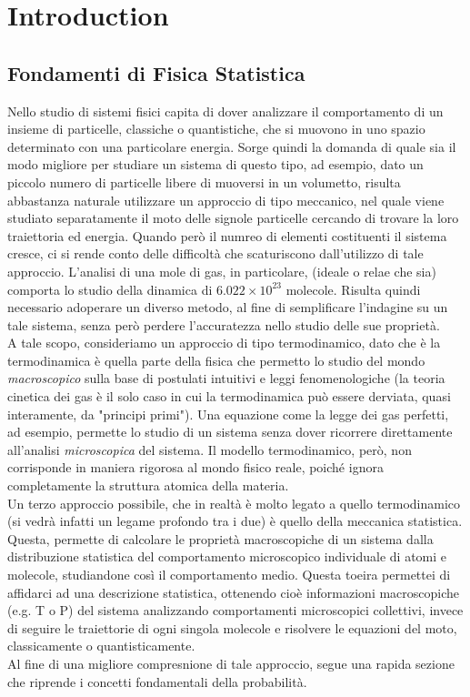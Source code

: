 \chapter*{Introduction}
\label{cha:introduction} %



\section*{Fondamenti di Fisica Statistica}

Nello studio di sistemi fisici capita di dover analizzare il comportamento di un insieme di particelle, classiche o quantistiche, che si muovono in uno spazio determinato con una particolare energia. Sorge quindi la domanda di quale sia il modo migliore per studiare un sistema di questo tipo, ad esempio, dato un piccolo numero di particelle libere di muoversi in un volumetto, risulta abbastanza naturale utilizzare un approccio di tipo meccanico, nel quale viene studiato separatamente il moto delle signole particelle cercando di trovare la loro traiettoria ed energia. Quando però il numreo di elementi costituenti il sistema cresce, ci si rende conto delle difficoltà che scaturiscono dall'utilizzo di tale approccio. L'analisi di una mole di gas, in particolare, (ideale o relae che sia) comporta lo studio della dinamica di $6.022\times 10^{23}$ molecole. Risulta quindi necessario adoperare un diverso metodo, al fine di semplificare l'indagine su un tale sistema, senza però perdere l'accuratezza nello studio delle sue proprietà.
\\
A tale scopo, consideriamo un approccio di tipo termodinamico, dato che è la termodinamica è quella parte della fisica che permetto lo studio del mondo \textit{macroscopico} sulla base di postulati intuitivi e leggi fenomenologiche (la teoria cinetica dei gas è il solo caso in cui la termodinamica può essere derviata, quasi interamente, da "principi primi"). Una equazione come la legge dei gas perfetti, ad esempio, permette lo studio di un sistema senza dover ricorrere direttamente all'analisi \textit{microscopica} del sistema. Il modello termodinamico, però, non corrisponde in maniera rigorosa al mondo fisico reale, poiché ignora completamente la struttura atomica della materia.
\\
Un terzo approccio possibile, che in realtà è molto legato a quello termodinamico (si vedrà infatti un legame profondo tra i due) è quello della meccanica statistica. Questa, permette di calcolare le proprietà macroscopiche di un sistema dalla distribuzione statistica del comportamento microscopico individuale di atomi e molecole, studiandone così il comportamento medio. Questa toeira permettei di affidarci ad una descrizione statistica, ottenendo cioè informazioni macroscopiche (e.g. T o P) del sistema analizzando comportamenti microscopici collettivi, invece di seguire le traiettorie di ogni singola molecole e risolvere le equazioni del moto, classicamente o quantisticamente.
\\
Al fine di una migliore compresnione di tale approccio, segue una rapida sezione che riprende i concetti fondamentali della probabilità.

